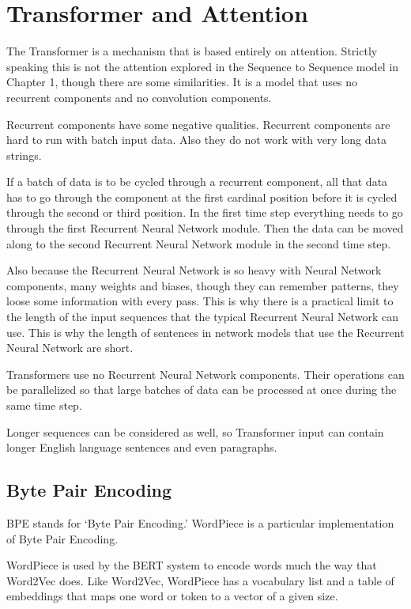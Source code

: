 
\section{Transformer and Attention}

The Transformer is a mechanism that is based entirely on attention. Strictly speaking this is not the attention explored in the Sequence to Sequence model in Chapter 1, though there are some similarities. It is a model that uses no recurrent components and no convolution components. 

Recurrent components have some negative qualities. Recurrent components are hard to run with batch input data. Also they do not work with very long data strings. 

If a batch of data is to be cycled through a recurrent component, all that data has to go through the component at the first cardinal position before it is cycled through the second or third position. In the first time step everything needs to go through the first Recurrent Neural Network module. Then the data can be moved along to the second Recurrent Neural Network  module in the second time step.

Also because the Recurrent Neural Network is so heavy with Neural Network components, many weights and biases, though they can remember patterns, they loose some information with every pass. This is why there is a practical limit to the length of the input sequences that the typical Recurrent Neural Network can use. This is why the length of sentences in network models that use the Recurrent Neural Network are short.

Transformers use no Recurrent Neural Network components. Their operations can be parallelized so that large batches of data can be processed at once during the same time step. 

Longer sequences can be considered as well, so Transformer input can contain longer English language sentences and even paragraphs.

\subsection*{Byte Pair Encoding}

\ac{BPE} stands for `Byte Pair Encoding.' WordPiece is a particular implementation of Byte Pair Encoding.

WordPiece is used by the BERT system to encode words much the way that Word2Vec does. Like Word2Vec, WordPiece  has a vocabulary list and a table of embeddings that maps one word or token to a vector of a given size.

